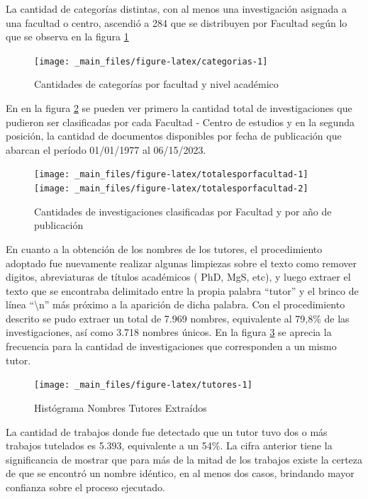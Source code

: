 \documentclass[
  12pt,
  openany]{book}
\begin{document}
La cantidad de categorías distintas, con al menos una investigación asignada a una facultad o centro, ascendió a 284 que se distribuyen por Facultad según lo que se observa en la figura \ref{fig:categorias}

\begin{figure}
\texttt{[image: \_main\_files/figure-latex/categorias-1]} \caption{Cantidades de categorías por facultad y nivel académico}\label{fig:categorias}
\end{figure}

En en la figura \ref{fig:totalesporfacultad} se pueden ver primero la cantidad total de investigaciones que pudieron ser clasificadas por cada Facultad - Centro de estudios y en la segunda posición, la cantidad de documentos disponibles por fecha de publicación que abarcan el período 01/01/1977 al 06/15/2023.

\begin{figure}
\texttt{[image: \_main\_files/figure-latex/totalesporfacultad-1]} \texttt{[image: \_main\_files/figure-latex/totalesporfacultad-2]} \caption{Cantidades de investigaciones clasificadas por Facultad y por año de publicación}\label{fig:totalesporfacultad}
\end{figure}

En cuanto a la obtención de los nombres de los tutores, el procedimiento adoptado fue nuevamente realizar algunas limpiezas sobre el texto como remover digitos, abreviaturas de títulos académicos ( PhD, MgS, etc), y luego extraer el texto que se encontraba delimitado entre la propia palabra ``tutor'' y el brinco de línea ``\textbackslash n'' más próximo a la aparición de dicha palabra. Con el procedimiento descrito se pudo extraer un total de 7.969 nombres, equivalente al 79,8\% de las investigaciones, así como 3.718 nombres únicos. En la figura \ref{fig:tutores} se aprecia la frecuencia para la cantidad de investigaciones que corresponden a un mismo tutor.

\begin{figure}
\texttt{[image: \_main\_files/figure-latex/tutores-1]} \caption{Histógrama Nombres Tutores Extraídos }\label{fig:tutores}
\end{figure}

La cantidad de trabajos donde fue detectado que un tutor tuvo dos o más trabajos tutelados es 5.393, equivalente a un 54\%. La cifra anterior tiene la significancia de mostrar que para más de la mitad de los trabajos existe la certeza de que se encontró un nombre idéntico, en al menos dos casos, brindando mayor confianza sobre el proceso ejecutado.
\end{document}

